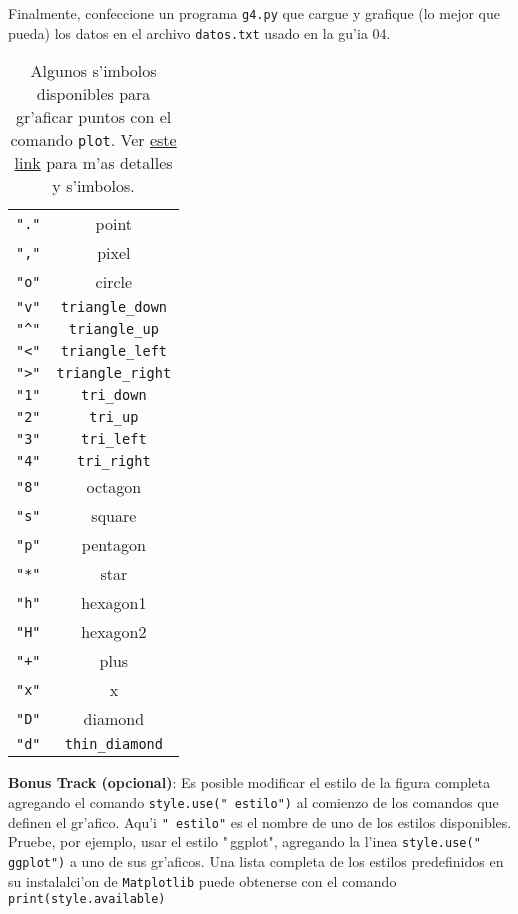 \documentclass[11pt]{exam}
\begin{document}
\begin{questions}
\item Finalmente, confeccione un programa \texttt{g4.py} que cargue y grafique (lo mejor que pueda) los datos en el archivo \texttt{datos.txt} usado en la gu'ia 04.%
\begin{table}
\begin{center}
\begin{tabular}{cc}
\verb|"."|	& point \\
\verb|","| & pixel \\
\verb|"o"|	& circle \\
\verb|"v"|	& \verb|triangle_down| \\
\verb|"^"|	& \verb|triangle_up| \\
\verb|"<"|	& \verb|triangle_left| \\
\verb|">"|	& \verb|triangle_right| \\
\verb|"1"|	& \verb|tri_down| \\
\verb|"2"|	& \verb|tri_up| \\
\verb|"3"|	& \verb|tri_left| \\
\verb|"4"|	& \verb|tri_right| \\
\verb|"8"|	& octagon \\
\verb|"s"|	& square \\
\verb|"p"|	& pentagon \\
\verb|"*"|	& star \\
\verb|"h"|	& hexagon1 \\
\verb|"H"|	& hexagon2 \\
\verb|"+"|	& plus \\
\verb|"x"|	& x \\
\verb|"D"|	& diamond \\
\verb|"d"|	& \verb|thin_diamond| 
\end{tabular}
\caption{Algunos s'imbolos disponibles para gr'aficar puntos con el comando \texttt{plot}. Ver \href{http://matplotlib.org/api/markers_api.html}{este link} para m'as detalles y s'imbolos.}
\label{t}
\end{center}
\end{table}
\item \textbf{Bonus Track (opcional)}: Es posible modificar el estilo de la figura completa agregando el comando \texttt{style.use("\,\!estilo")} al comienzo de los comandos que definen el gr'afico. Aqu'i \texttt{"\,\!estilo"} es el nombre de uno de los estilos disponibles. Pruebe, por ejemplo, usar el estilo "\,\!ggplot", agregando la l'inea \texttt{style.use("\,\!ggplot")} a uno de sus gr'aficos. Una lista completa de los estilos predefinidos en su instalalci'on de \texttt{Matplotlib} puede obtenerse con el comando \texttt{print(style.available)}


\end{questions}
\end{document}

